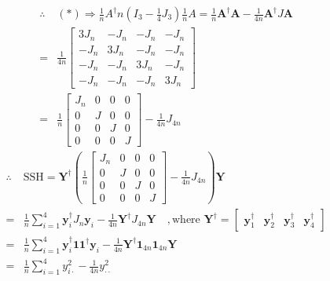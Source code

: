 \documentclass{article}
\begin{document}
\begin{eqnarray*}
&\therefore &\left( \ast \right) \Rightarrow \frac{1}{n}A^{\dagger }n\left(
I_{3}-\frac{1}{4}J_{3}\right) \frac{1}{n}A=\frac{1}{n}\mathbf{A}^{\dagger }%
\mathbf{A-}\frac{1}{4n}\mathbf{A}^{\dagger }J\mathbf{A} \\
&=&\frac{1}{4n}\left[ 
\begin{array}{cccc}
3J_{n} & -J_{n} & -J_{n} & -J_{n} \\ 
-J_{n} & 3J_{n} & -J_{n} & -J_{n} \\ 
-J_{n} & -J_{n} & 3J_{n} & -J_{n} \\ 
-J_{n} & -J_{n} & -J_{n} & 3J_{n}%
\end{array}%
\right] \\
&=&\frac{1}{n}\left[ 
\begin{array}{cccc}
J_{n} & 0 & 0 & 0 \\ 
0 & J & 0 & 0 \\ 
0 & 0 & J & 0 \\ 
0 & 0 & 0 & J%
\end{array}%
\right] -\frac{1}{4n}J_{4n}
\end{eqnarray*}%
\begin{eqnarray*}
&\therefore &\text{SSH}=\mathbf{Y}^{\dagger }\left( \frac{1}{n}\left[ 
\begin{array}{cccc}
J_{n} & 0 & 0 & 0 \\ 
0 & J & 0 & 0 \\ 
0 & 0 & J & 0 \\ 
0 & 0 & 0 & J%
\end{array}%
\right] -\frac{1}{4n}J_{4n}\right) \mathbf{Y} \\
&=&\frac{1}{n}\sum\limits_{i=1}^{4}\mathbf{y}_{i}^{\dagger }J_{n}\mathbf{y}%
_{i}-\frac{1}{4n}\mathbf{Y}^{\dagger }J_{4n}\mathbf{Y\quad ,}\text{where }%
\mathbf{Y}^{\dagger }=\left[ 
\begin{array}{cccc}
\mathbf{y}_{1}^{\dagger } & \mathbf{y}_{2}^{\dagger } & \mathbf{y}%
_{3}^{\dagger } & \mathbf{y}_{4}^{\dagger }%
\end{array}%
\right] \\
&=&\frac{1}{n}\sum\limits_{i=1}^{4}\mathbf{y}_{i}^{\dagger }\mathbf{11}%
^{\dagger }\mathbf{y}_{i}-\frac{1}{4n}\mathbf{Y}^{\dagger }\mathbf{1}_{4n}%
\mathbf{1}_{4n}\mathbf{Y} \\
&=&\frac{1}{n}\sum\limits_{i=1}^{4}y_{i\cdot }^{2}-\frac{1}{4n}y_{\cdot
\cdot }^{2}
\end{eqnarray*}%
\end{document}
